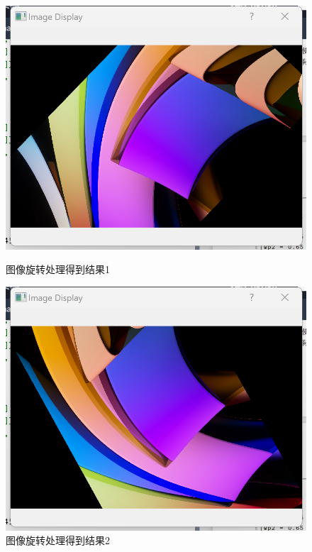 \documentclass[a4paper,12pt]{article}
\begin{document}
\begin{figure}
    \begin{minipage}[b]{0.48\textwidth}
        \centering
        \includegraphics[width=\linewidth]{images/Design/image_processing/4/rotate1.png}
        \caption{图像旋转处理得到结果1}
    \end{minipage}
    \hfill
    \begin{minipage}[b]{0.48\textwidth}
        \centering
        \includegraphics[width=\linewidth]{images/Design/image_processing/4/rotate2.png}
        \caption{图像旋转处理得到结果2}
    \end{minipage}
\end{figure}
\end{document}
